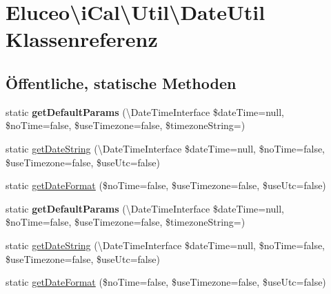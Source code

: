 \hypertarget{class_eluceo_1_1i_cal_1_1_util_1_1_date_util}{}\section{Eluceo\textbackslash{}i\+Cal\textbackslash{}Util\textbackslash{}Date\+Util Klassenreferenz}
\label{class_eluceo_1_1i_cal_1_1_util_1_1_date_util}
\subsection*{Öffentliche, statische Methoden}
\begin{DoxyCompactItemize}
\item 
\mbox{\label{class_eluceo_1_1i_cal_1_1_util_1_1_date_util_a25b13487df52f22514136a75dc2c5098}} 
static {\bfseries get\+Default\+Params} (\textbackslash{}Date\+Time\+Interface \$date\+Time=null, \$no\+Time=false, \$use\+Timezone=false, \$timezone\+String=\textquotesingle{}\textquotesingle{})
\item 
static \mbox{\hyperlink{class_eluceo_1_1i_cal_1_1_util_1_1_date_util_a999cb52e7d1d4ab1df3de5ab86c936c1}{get\+Date\+String}} (\textbackslash{}Date\+Time\+Interface \$date\+Time=null, \$no\+Time=false, \$use\+Timezone=false, \$use\+Utc=false)
\item 
static \mbox{\hyperlink{class_eluceo_1_1i_cal_1_1_util_1_1_date_util_ae98cad5c4edafa11ce5bc75ff0504ceb}{get\+Date\+Format}} (\$no\+Time=false, \$use\+Timezone=false, \$use\+Utc=false)
\item 
\mbox{\label{class_eluceo_1_1i_cal_1_1_util_1_1_date_util_a25b13487df52f22514136a75dc2c5098}} 
static {\bfseries get\+Default\+Params} (\textbackslash{}Date\+Time\+Interface \$date\+Time=null, \$no\+Time=false, \$use\+Timezone=false, \$timezone\+String=\textquotesingle{}\textquotesingle{})
\item 
static \mbox{\hyperlink{class_eluceo_1_1i_cal_1_1_util_1_1_date_util_a999cb52e7d1d4ab1df3de5ab86c936c1}{get\+Date\+String}} (\textbackslash{}Date\+Time\+Interface \$date\+Time=null, \$no\+Time=false, \$use\+Timezone=false, \$use\+Utc=false)
\item 
static \mbox{\hyperlink{class_eluceo_1_1i_cal_1_1_util_1_1_date_util_ae98cad5c4edafa11ce5bc75ff0504ceb}{get\+Date\+Format}} (\$no\+Time=false, \$use\+Timezone=false, \$use\+Utc=false)

\end{DoxyCompactItemize}
